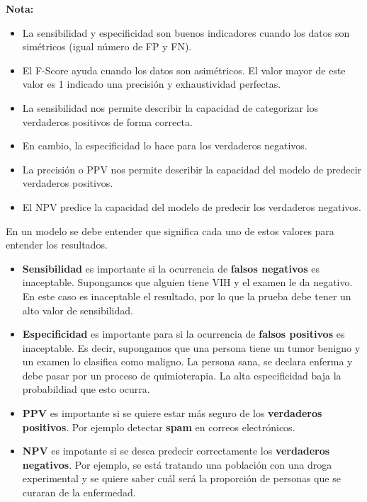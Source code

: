 \documentclass[
  12pt,
]{book}
\providecommand{\tightlist}{%
  \setlength{\itemsep}{0pt}\setlength{\parskip}{0pt}}
\begin{document}
\textbf{Nota:}

\begin{itemize}
\tightlist
\item
  La sensibilidad y especificidad son buenos indicadores cuando los
  datos son simétricos (igual número de FP y FN).
\item
  El F-Score ayuda cuando los datos son asimétricos. El valor mayor de
  este valor es 1 indicado una precisión y exhaustividad perfectas.
\item
  La sensibilidad nos permite describir la capacidad de categorizar los
  verdaderos positivos de forma correcta.
\item
  En cambio, la especificidad lo hace para los verdaderos negativos.
\item
  La precisión o PPV nos permite describir la capacidad del modelo de
  predecir verdaderos positivos.
\item
  El NPV predice la capacidad del modelo de predecir los verdaderos
  negativos.
\end{itemize}

En un modelo se debe entender que significa cada uno de estos valores
para entender los resultados.

\begin{itemize}
\tightlist
\item
  \textbf{Sensibilidad} es importante si la ocurrencia de \textbf{falsos
  negativos} es inaceptable. Supongamos que alguien tiene VIH y el
  examen le da negativo. En este caso es inaceptable el resultado, por
  lo que la prueba debe tener un alto valor de sensibilidad.
\item
  \textbf{Especificidad} es importante para si la ocurrencia de
  \textbf{falsos positivos} es inaceptable. Es decir, supongamos que una
  persona tiene un tumor benigno y un examen lo clasifica como maligno.
  La persona sana, se declara enferma y debe pasar por un proceso de
  quimioterapia. La alta especificidad baja la probabildiad que esto
  ocurra.
\item
  \textbf{PPV} es importante si se quiere estar más seguro de los
  \textbf{verdaderos positivos}. Por ejemplo detectar \textbf{spam} en
  correos electrónicos.
\item
  \textbf{NPV} es impotante si se desea predecir correctamente los
  \textbf{verdaderos negativos}. Por ejemplo, se está tratando una
  población con una droga experimental y se quiere saber cuál será la
  proporción de personas que se curaran de la enfermedad.
\end{itemize}
\end{document}

